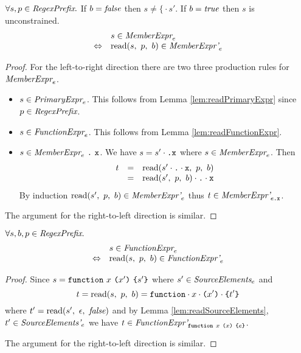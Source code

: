 \documentclass[preprint,10pt]{sigplanconf}
\begin{document}
\begin{lemma}\mbox{}

  \( \forall s, p \in \textit{RegexPrefix}. \)
  If \( b = \textit{false} \) then \( s \not = \texttt{\{} \cdot s' \). If \(
  b = \textit{true} \) then \( s \) is unconstrained.
  \[
  \begin{array}{rl}
  &s \in \textit{MemberExpr}_{e} 
  \\
  \Leftrightarrow&
  \textrm{read}(s,~p,~b) \in \textit{MemberExpr'}_{e} 
  \end{array}
  \]
\end{lemma}
\begin{proof}
  For the left-to-right direction there are two three production rules
  for \( \textit{MemberExpr}_{e} \).
  \begin{itemize}
  \item \( s \in \textit{PrimaryExpr}_{e} \). This follows from Lemma
    \ref{lem:readPrimaryExpr} since \( p \in \textit{RegexPrefix} \).
    
  \item \( s \in \textit{FunctionExpr}_{e} \). This follows from Lemma
    \ref{lem:readFunctionExpr}.
    
  \item \( s \in \textit{MemberExpr}_{e} ~\texttt{.}~\texttt{x} \). We have \(
    s = s' \cdot \texttt{.} \texttt{x} \) where \( s \in
    \textit{MemberExpr}_{e} \). Then
    \[
    \begin{array}{rcl}
      t &=& \textrm{read}(s' \cdot \texttt{.} \cdot \texttt{x},~p,~b)
      \\
      &=& \textrm{read}(s',~p,~b) \cdot \texttt{.} \cdot \texttt{x}
    \end{array}
    \]
    By induction \( \textrm{read}(s',~p,~b) \in \textit{MemberExpr'}_{e}
    \) thus \( t \in \textit{MemberExpr'}_{e\texttt{.\texttt{x}}} \).
  \end{itemize}
  
  The argument for the right-to-left direction is similar.
\end{proof}

\begin{lemma}\mbox{}

  \( \forall s, b, p \in \textit{RegexPrefix}. \)
  \[
  \begin{array}{rl}
  &s \in \textit{FunctionExpr}_{e} 
  \\
  \Leftrightarrow &
  \textrm{read}(s,~p,~b) \in \textit{FunctionExpr'}_{e} 
  \end{array}
  \]
\end{lemma}
\begin{proof}
  Since \( s = \texttt{function}~x~\texttt{(}x'\texttt{)}~\texttt{\{}s'\texttt{\}} \) where
  \( s' \in \textit{SourceElements}_{e} \) and 
  \[ 
  t = \textrm{read}(s,~p,~b) = 
  \texttt{function} \cdot x \cdot \texttt{(}x'\texttt{)} \cdot \texttt{\{}t'\texttt{\}}
  \]
  where \( t' = \textrm{read}(s',~\epsilon,~\textit{false}) \) and by Lemma
  \ref{lem:readSourceElements}, \( t' \in \textit{SourceElements'}_{e}
  \) we have \( t \in \textit{FunctionExpr'}_{\texttt{function}~x~\texttt{(}x\texttt{)}~\texttt{\{}e\texttt{\}}} \).
  
  The argument for the right-to-left direction is similar.
\end{proof}
\end{document}

